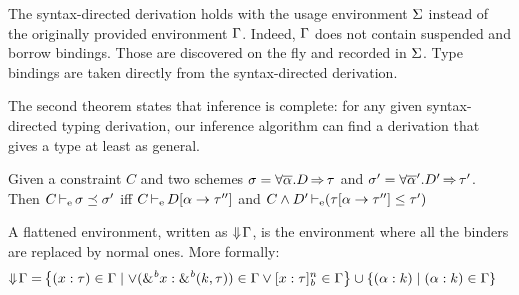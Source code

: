 The syntax-directed derivation holds with the usage environment $\Sv$ instead of the originally provided environment $\E$. Indeed,
$\E$ does not contain suspended and borrow bindings. Those
are discovered on the fly and recorded in $\Sv$. Type bindings
are taken directly from the syntax-directed derivation.

The second theorem states that inference is complete: for any given
syntax-directed typing derivation, our inference algorithm can find
a derivation that gives a type at least as general.


\begin{definition}
  Given a constraint $C$ and two schemes
  $\schm = \forall \Multi\tvar. \qual{D}{\tau}$ and
  $\schm' = \forall \Multi\tvar'. \qual{D'}{\tau'} $.
  Then $\entail{C}{\schm \preceq \schm'}$
  iff $\entail{C}{\subst{\tvar}{\tau''} D}$
  and $\entail{C\Cand D'}{\Cleq{\subst{\tvar}{\tau''}\tau}{\tau'}}$
\end{definition}

\begin{definition}
A flattened environment,
written as $\Eflat\E$, is the environment
where all the binders are replaced by normal ones. More formally:
\begin{align*}
  \Eflat\E
  =& \left\{\bvar{x}{\tau}\in\E \mid
    \vee \bvar{\borrow{x}}{\borrowty{k}{\tau}}\in\E
    \vee \svar{x}{\tau}^n\in\E
    \right\}
     \cup \left\{ \bvar{\tvar}{k} \mid \bvar{\tvar}{k}\in\E \right\}
\end{align*}
\end{definition}




